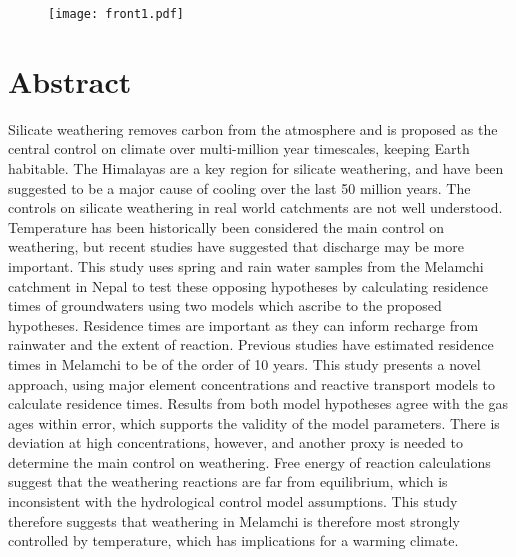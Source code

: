 \documentclass[hidelinks, 12pt]{article} %
\title{
  \vspace{-1cm}
  {\fontsize{16pt}{18pt}\selectfont
    \textbf{
      \strut Ground Truthing Earth's Silicate Weathering Thermostat:\\[0.4em] %
      \strut Using the Geochemistry of Himalayan Groundwaters to \\[-0.2em]
      \strut Calculate Residence Times
    }
  }
  \vspace{0.5cm}
}
\author{Giovanni Bernardi\\ 
Part III Project}
\date{2024-2025}
\begin{document}

\maketitle

\begingroup
\renewcommand{\thefigure}{} %
\begin{figure}[h]
  \centering
      \texttt{[image: front1.pdf]}
\end{figure}
\endgroup


\thispagestyle{empty}

\newpage

\section*{Abstract}
\label{sec:abstract}


Silicate weathering removes carbon from the atmosphere and is proposed as the central control on climate over multi-million year timescales, keeping Earth habitable. The Himalayas are a key region for silicate weathering, and have been suggested to be a major cause of cooling over the last 50 million years. The controls on silicate weathering in real world catchments are not well understood. Temperature has been historically been considered the main control on weathering, but recent studies have suggested that discharge may be more important. This study uses spring and rain water samples from the Melamchi catchment in Nepal to test these opposing hypotheses by calculating residence times of groundwaters using two models which ascribe to the proposed hypotheses. Residence times are important as they can inform recharge from rainwater and the extent of reaction. Previous studies have estimated residence times in Melamchi to be of the order of 10 years. This study presents a novel approach, using major element concentrations and reactive transport models to calculate residence times. Results from both model hypotheses agree with the gas ages within error, which supports the validity of the model parameters. There is deviation at high concentrations, however, and another proxy is needed to determine the main control on weathering. Free energy of reaction calculations suggest that the weathering reactions are far from equilibrium, which is inconsistent with the hydrological control model assumptions. This study therefore suggests that weathering in Melamchi is therefore most strongly controlled by temperature, which has implications for a warming climate.
\end{document}
